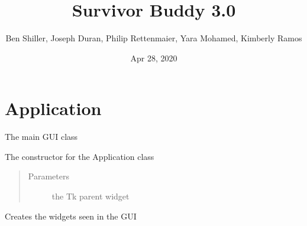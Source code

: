\documentclass[letterpaper,10pt,english,openany,oneside]{sphinxmanual}
\title{Survivor Buddy 3.0}
\date{Apr 28, 2020}
\author{Ben Shiller, Joseph Duran, Philip Rettenmaier, Yara Mohamed, Kimberly Ramos}
\begin{document}
\pagestyle{empty}
\sphinxmaketitle
\pagestyle{plain}
\sphinxtableofcontents
\pagestyle{normal}
\label{\detokenize{index::doc}}



\chapter{Application}
\label{\detokenize{src/application:module-Application}}\label{\detokenize{src/application:application}}\label{\detokenize{src/application::doc}}

\begin{fulllineitems}
\label{\detokenize{src/application:Application.Application}}
The main GUI class

\begin{fulllineitems}
\label{\detokenize{src/application:Application.Application.__init__}}
The constructor for the Application class
\begin{quote}\begin{description}
\item[{Parameters}] \leavevmode
{} \textendash{} the Tk parent widget

\end{description}\end{quote}

\end{fulllineitems}


\begin{fulllineitems}
\label{\detokenize{src/application:Application.Application.create_widgets}}
Creates the widgets seen in the GUI


\end{fulllineitems}
\end{fulllineitems}
\end{document}
